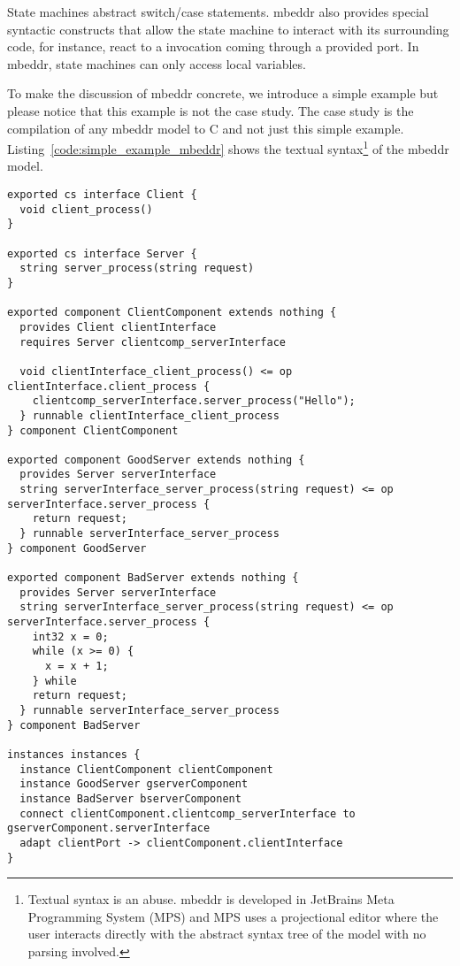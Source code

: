 State machines abstract switch/case statements. mbeddr also provides special syntactic constructs that allow the state machine to interact with its surrounding code, for instance, react to a invocation coming through a provided port. In mbeddr, state machines can only access local variables.

To make the discussion of mbeddr concrete, we introduce a simple example but please notice that this example is not the case study. The case study is the compilation of any mbeddr model to C and not just this simple example.
Listing~\ref{code:simple_example_mbeddr} shows the textual syntax\footnote{Textual syntax is an abuse. mbeddr is developed in JetBrains Meta Programming System (MPS) and MPS uses a projectional editor where the user interacts directly with the abstract syntax tree of the model with no parsing involved.} of the mbeddr model.


\begin{lstlisting}[float]
exported cs interface Client { 
  void client_process() 
} 

exported cs interface Server { 
  string server_process(string request) 
} 

exported component ClientComponent extends nothing { 
  provides Client clientInterface 
  requires Server clientcomp_serverInterface 
   
  void clientInterface_client_process() <= op clientInterface.client_process { 
    clientcomp_serverInterface.server_process("Hello"); 
  } runnable clientInterface_client_process 
} component ClientComponent 

exported component GoodServer extends nothing { 
  provides Server serverInterface 
  string serverInterface_server_process(string request) <= op serverInterface.server_process { 
    return request; 
  } runnable serverInterface_server_process 
} component GoodServer 

exported component BadServer extends nothing { 
  provides Server serverInterface 
  string serverInterface_server_process(string request) <= op serverInterface.server_process { 
    int32 x = 0; 
    while (x >= 0) { 
      x = x + 1; 
    } while 
    return request; 
  } runnable serverInterface_server_process 
} component BadServer 

instances instances { 
  instance ClientComponent clientComponent 
  instance GoodServer gserverComponent 
  instance BadServer bserverComponent 
  connect clientComponent.clientcomp_serverInterface to gserverComponent.serverInterface 
  adapt clientPort -> clientComponent.clientInterface 
}
\end{lstlisting}

